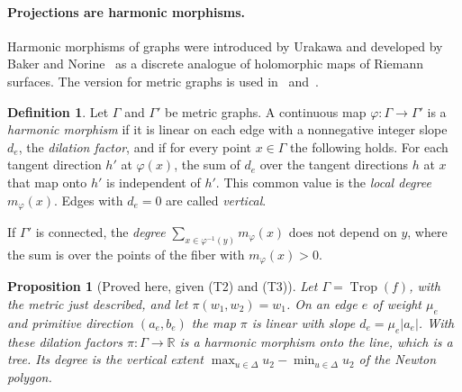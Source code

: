 \documentclass[12pt,letterpaper]{article}
\numberwithin{equation}{section}
\newtheorem{proposition}[theorem]{Proposition}
\theoremstyle{definition}
\newtheorem{definition}[theorem]{Definition}
\theoremstyle{remark}
\newcommand{\R}{\mathbb{R}}
\begin{document}
\paragraph{Projections are harmonic morphisms.}
Harmonic morphisms of graphs were introduced by Urakawa and developed by Baker
and Norine~\cite{BN09} as a discrete analogue of holomorphic maps of Riemann
surfaces. The version for metric graphs is used in~\cite{Ch13}
and~\cite{ABBR15}.

\begin{definition}\label{def:harmonic}
Let $\Gamma$ and $\Gamma'$ be metric graphs. A continuous map
$\varphi:\Gamma\to\Gamma'$ is a \emph{harmonic morphism} if it is linear on
each edge with a nonnegative integer slope $d_e$, the \emph{dilation factor},
and if for every point $x\in\Gamma$ the following holds. For each tangent
direction $h'$ at $\varphi(x)$, the sum of $d_e$ over the tangent directions $h$
at $x$ that map onto $h'$ is independent of $h'$. This common value is the
\emph{local degree} $m_\varphi(x)$. Edges with $d_e=0$ are called
\emph{vertical}.
\end{definition}

If $\Gamma'$ is connected, the \emph{degree}
$\sum_{x\in\varphi^{-1}(y)}m_\varphi(x)$ does not depend on $y$, where the sum is
over the points of the fiber with $m_\varphi(x)>0$.

\begin{proposition}[Proved here, given (T2) and (T3)]\label{prop:projharmonic}
Let $\Gamma=\operatorname{Trop}(f)$, with the metric just described, and let
$\pi(w_1,w_2)=w_1$. On an edge $e$ of weight $\mu_e$ and primitive direction
$(a_e,b_e)$ the map $\pi$ is linear with slope $d_e=\mu_e|a_e|$. With these
dilation factors $\pi:\Gamma\to\R$ is a harmonic morphism onto the line, which
is a tree. Its degree is the vertical extent
$\max_{u\in\Delta}u_2-\min_{u\in\Delta}u_2$ of the Newton polygon.
\end{proposition}
\end{document}
